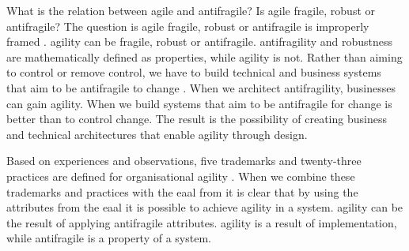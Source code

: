 What is the relation between \gls{agile} and \gls{antifragile}? Is \gls{agile} \gls{fragile}, \gls{robust} or \gls{antifragile}? The question is \gls{agile} \gls{fragile}, \gls{robust} or \gls{antifragile} is improperly framed \parencite[p.~6]{Tomov2019}. \Gls{agility} can be \gls{fragile}, \gls{robust} or \gls{antifragile}. \Gls{antifragility} and \gls{robustness} are mathematically defined as properties, while \gls{agility} is not. Rather than aiming to control or remove control, we have to build technical and business systems that aim to be \gls{antifragile} to change \parencite[p.~884]{OReilly2019}. When we architect \gls{antifragility}, businesses can gain \gls{agility}. When we build systems that aim to be \gls{antifragile} for change is better than to control change. The result is the possibility of creating business and technical architectures that enable \gls{agility} through design.

Based on experiences and observations, five trademarks and twenty-three practices are defined for organisational agility \parencite[p.~7]{Aghina2018}. When we combine these trademarks and practices with the \acrlong{eaal} from \textcite[p.~7]{Botjes2021} it is clear that by using the attributes from the \acrlong{eaal} it is possible to achieve \gls{agility} in a system. \Gls{agility} can be the result of applying \gls{antifragile} \glspl{attribute}. \Gls{agility} is a result of implementation, while \gls{antifragile} is a property of a system.

